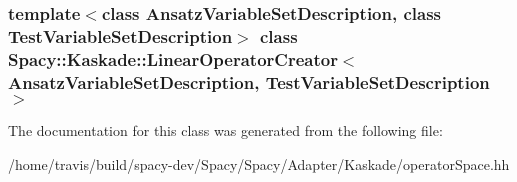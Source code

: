 \subsubsection*{template$<$class Ansatz\-Variable\-Set\-Description, class Test\-Variable\-Set\-Description$>$ class Spacy\-::\-Kaskade\-::\-Linear\-Operator\-Creator$<$ Ansatz\-Variable\-Set\-Description, Test\-Variable\-Set\-Description $>$}



\-The documentation for this class was generated from the following file\-:\begin{DoxyCompactItemize}
\item 
/home/travis/build/spacy-\/dev/\-Spacy/\-Spacy/\-Adapter/\-Kaskade/operator\-Space.\-hh\end{DoxyCompactItemize}
